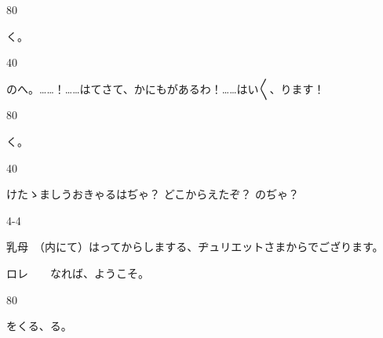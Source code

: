 \documentclass[tate,paper=b6j,jafontsize=9pt]{jlreq}
\begin{document}
\begin{azconvIndented}{8\zw}{0\zw}

く。

\end{azconvIndented}
\begin{azconvIndented}{4\zw}{0\zw}

のへ。……！……はてさて、かにもがあるわ！……はい{〳〵}、ります！

\end{azconvIndented}
\begin{azconvIndented}{8\zw}{0\zw}

く。

\end{azconvIndented}
\begin{azconvIndented}{4\zw}{0\zw}

けたゝましうおきゃるはぢゃ？ どこからえたぞ？ のぢゃ？

\end{azconvIndented}
\begin{azconvIndented}{4\zw}{-4\zw}

乳母　（内にて）はってからしまする、ヂュリエットさまからでござります。

ロレ　　なれば、ようこそ。

\end{azconvIndented}
\begin{azconvIndented}{8\zw}{0\zw}

をくる、る。

\end{azconvIndented}
\end{document}

